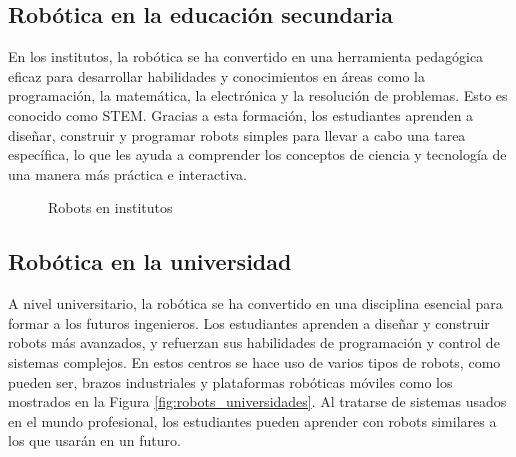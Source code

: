 \subsection{Robótica en la educación secundaria}
\noindent En los institutos, la robótica se ha convertido en una herramienta pedagógica eficaz para desarrollar habilidades y conocimientos en áreas como la programación, 
la matemática, la electrónica y la resolución de problemas. Esto es conocido como \ac{STEM}. Gracias a esta formación, los 
estudiantes aprenden a diseñar, construir y programar robots simples para llevar a cabo una tarea específica, lo que les ayuda a comprender  
los conceptos de ciencia y tecnología de una manera más práctica e interactiva.\\
\begin{figure} [ht!]
  \centering    
  \hspace{1cm}
  \caption{Robots en institutos}
\end{figure}


\subsection{Robótica en la universidad}
\noindent A nivel universitario, la robótica se ha convertido en una disciplina esencial para formar a los futuros ingenieros. Los estudiantes aprenden 
a diseñar y construir robots más avanzados, y refuerzan sus habilidades de programación y control de sistemas complejos. En estos centros 
se hace uso de varios tipos de robots, como pueden ser, brazos industriales y plataformas robóticas móviles como los mostrados en la Figura \ref{fig:robots_universidades}. Al tratarse de sistemas 
usados en el mundo profesional, los estudiantes pueden aprender con robots similares a los que usarán en un futuro. 

